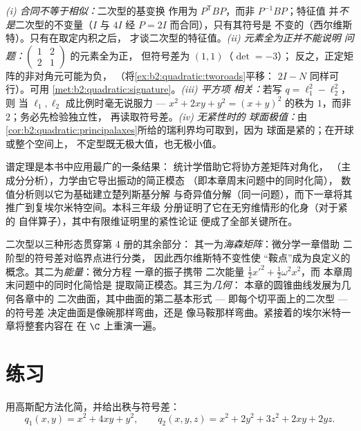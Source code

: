 \begin{remark}[常见误区]
\emph{(i) 合同不等于相似：}二次型的基变换
作用为 $P^{\mathsf T}BP$，而非 $P^{-1}BP$；特征值
并\emph{不是}二次型的不变量（$I$ 与 $4I$
经 $P = 2I$ 而合同），只有其符号是
不变的（西尔维斯特）。只有在取定内积之后，
才谈二次型的特征值。\emph{(ii) 元素全为正并不能说明
问题：}$\begin{pmatrix} 1 & 2\\ 2 & 1\end{pmatrix}$ 的元素全为正，
但符号差为 $(1,1)$（$\det = -3$）；
反之，正定矩阵的非对角元可能为负，
（将\cref{ex:b2:quadratic:tworoads}平移：
$2I - N$ 同样可行）。可用
\cref{met:b2:quadratic:signature}。\emph{(iii) 平方项
相关：}若写 $q = \ell_1^2 - \ell_2^2$，则
当 $\ell_1, \ell_2$ 成比例时毫无说服力 --- $x^2 + 2xy + y^2 =
(x+y)^2$ 的秩为 $1$，而非 $2$；务必先检验独立性，
再读取符号差。\emph{(iv) 无紧性时的
球面极值：}由
\cref{cor:b2:quadratic:principalaxes}所给的瑞利界均可取到，因为
球面是紧的；在开球或整个空间上，
不定型既无极大值，也无极小值。
\end{remark}

\begin{remark}[应用]
谱定理是本书中应用最广的一条结果：
统计学借助它将协方差矩阵对角化，
（主成分分析），力学由它导出振动的简正模态
（即本章周末问题中的同时化简），
数值分析则以它为基础建立楚列斯基分解
与奇异值分解（同一问题），而下一章将其
推广到复埃尔米特空间。本科三年级
分册证明了它在无穷维情形的化身（对于紧的
自伴算子），其中有限维证明里的紧性论证
便成了全部关键所在。
\end{remark}

\begin{remark}[本分册内的展望]
二次型以三种形态贯穿第 4 册的其余部分：
其一为\emph{海森矩阵}：微分学一章借助
二阶型的符号差对临界点进行分类，
因此西尔维斯特不变性使
“鞍点”成为良定义的概念。其二为\emph{能量}：微分方程
一章的振子携带
二次能量 $\frac12x'^2 + \frac12\omega^2x^2$，而
本章周末问题中的同时化简恰是
提取简正模态。其三为\emph{几何}：
本章的圆锥曲线发展为几何各章中的
二次曲面，其中曲面的第二基本形式 ---
即每个切平面上的二次型 --- 的符号差
决定曲面是像碗那样弯曲，还是
像马鞍那样弯曲。紧接着的埃尔米特一章将整套内容在
在 $\C$ 上重演一遍。
\end{remark}

\section{练习}

\begin{exercise}[$\star$]\label{exo:b2:quadratic:1}
用高斯配方法化简，并给出秩与符号差：
\[
q_1(x,y) = x^2 + 4xy + y^2,
\qquad
q_2(x,y,z) = x^2 + 2y^2 + 3z^2 + 2xy + 2yz .
\]
\end{exercise}

